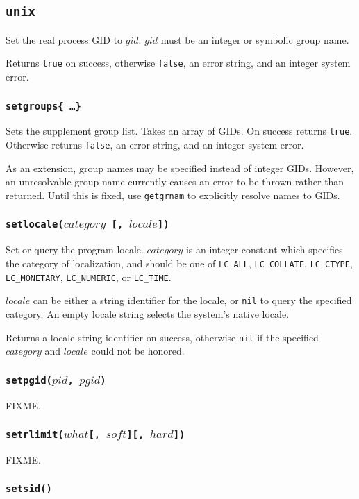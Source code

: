 \documentclass[11pt, oneside]{memoir}
\newcommand*{\true}[0]{\texttt{true}\xspace}
\newcommand*{\false}[0]{\texttt{false}\xspace}
\newcommand*{\nil}[0]{\texttt{nil}\xspace}
\newcommand*{\fn}[1]{\texttt{#1}\xspace}
\newcounter{toccols}
\newenvironment{Module}[1]{
	\subsection{\texttt{#1}}
	\addtocontents{toc}{
		\protect\begin{multicols}{\value{toccols}}
	}
}{
	\addtocontents{toc}{\protect\end{multicols}}
}
\begin{document}
\begin{Module}{unix}
Set the real process GID to $gid$. $gid$ must be an integer or symbolic group name.

Returns \true on success, otherwise \false, an error string, and an integer system error.

\subsubsection[\fn{setgroups}]{\fn{setgroups\{ \ldots \}}}

Sets the supplement group list. Takes an array of GIDs. On success returns \true. Otherwise returns \false, an error string, and an integer system error.

As an extension, group names may be specified instead of integer GIDs. However, an unresolvable group name currently causes an error to be thrown rather than returned. Until this is fixed, use \fn{getgrnam} to explicitly resolve names to GIDs.

\subsubsection[\fn{setlocale}]{\fn{setlocale($category$ [, $locale$])}}

Set or query the program locale. $category$ is an integer constant which specifies the category of localization, and should be one of \texttt{LC\_ALL}, \texttt{LC\_COLLATE}, \texttt{LC\_CTYPE}, \texttt{LC\_MONETARY}, \texttt{LC\_NUMERIC}, or \texttt{LC\_TIME}.

$locale$ can be either a string identifier for the locale, or \nil to query the specified category. An empty locale string selects the system's native locale.

Returns a locale string identifier on success, otherwise \nil if the specified $category$ and $locale$ could not be honored.

\subsubsection[\fn{setpgid}]{\fn{setpgid($pid$, $pgid$)}}

FIXME.

\subsubsection[\fn{setrlimit}]{\fn{setrlimit($what$[, $soft$][, $hard$])}}

FIXME.

\subsubsection[\fn{setsid}]{\fn{setsid()}}


\end{Module}
\end{document}
